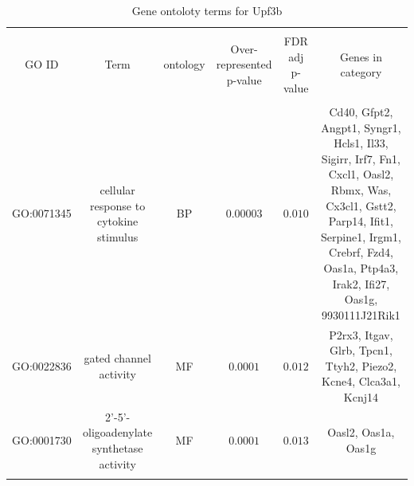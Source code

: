 
\begin{table}[!htbp] \centering 
  \caption{Gene ontoloty terms for Upf3b} 
  \label{} 
\begin{tabular}{@{\extracolsep{5pt}} cccccc} 
\\[-1.8ex]\hline 
\hline \\[-1.8ex] 
GO ID & Term & ontology & Over-represented p-value & FDR adj p-value & Genes in category \\ 
\hline \\[-1.8ex] 
GO:0071345 & cellular response to cytokine stimulus & BP & $0.00003$ & $0.010$ & Cd40, Gfpt2, Angpt1, Syngr1, Hcls1, Il33, Sigirr, Irf7, Fn1, Cxcl1, Oasl2, Rbmx, Was, Cx3cl1, Gstt2, Parp14, Ifit1, Serpine1, Irgm1, Crebrf, Fzd4, Oas1a, Ptp4a3, Irak2, Ifi27, Oas1g, 9930111J21Rik1 \\ 
GO:0022836 & gated channel activity & MF & $0.0001$ & $0.012$ & P2rx3, Itgav, Glrb, Tpcn1, Ttyh2, Piezo2, Kcne4, Clca3a1, Kcnj14 \\ 
GO:0001730 & 2'-5'-oligoadenylate synthetase activity & MF & $0.0001$ & $0.013$ & Oasl2, Oas1a, Oas1g \\ 
\hline \\[-1.8ex] 
\end{tabular} 
\end{table} 
